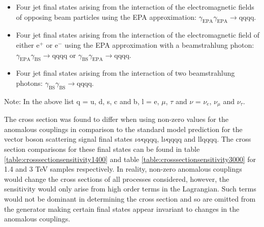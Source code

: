 \begin{itemize}
\item Four jet final states arising from the interaction of the electromagnetic fields of opposing beam particles using the EPA approximation: $\gamma_{\text{EPA}}\gamma_{\text{EPA}} \rightarrow \text{qqqq}$.
\item Four jet final states arising from the interaction of the electromagnetic field of either $\text{e}^{+}$ or $\text{e}^{-}$ using the EPA approximation with a beamstrahlung photon: $\gamma_{\text{EPA}}\gamma_{\text{BS}} \rightarrow \text{qqqq}$ or $\gamma_{\text{BS}}\gamma_{\text{EPA}} \rightarrow \text{qqqq}$.
\item Four jet final states arising from the interaction of two beamstrahlung photons: $\gamma_{\text{BS}}\gamma_{\text{BS}} \rightarrow \text{qqqq}$.
\end{itemize}

Note: In the above list q = u, d, s, c and b, l = e, $\mu$, $\tau$ and $\nu$ = $\nu_{e}$, $\nu_{\mu}$ and $\nu_{\tau}$.

The cross section was found to differ when using non-zero values for the anomalous couplings in comparison to the standard model prediction for the vector boson scattering signal final states $\nu\nu\text{qqqq}$, $\text{l}\nu\text{qqqq}$ and llqqqq.  The cross section comparisons for these final states can be found in table \ref{table:crosssectionsensitivity1400} and table \ref{table:crosssectionsensitivity3000} for 1.4 and 3 TeV samples respectively.  In reality, non-zero anomalous couplings would change the cross sections of all processes considered, however, the sensitivity would only arise from high order terms in the Lagrangian.  Such terms would not be dominant in determining the cross section and so are omitted from the generator making certain final states appear invariant to changes in the anomalous couplings.

